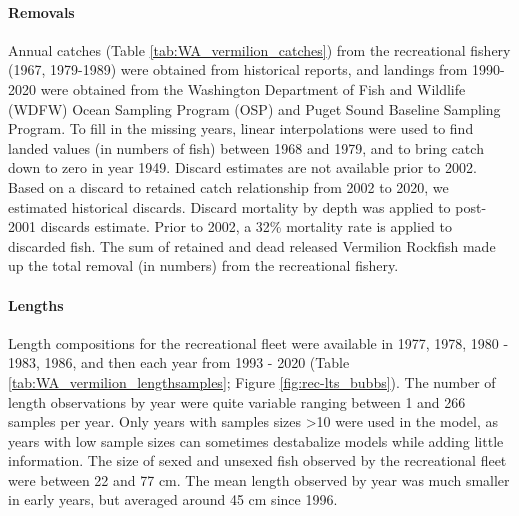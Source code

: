 \documentclass[11pt,
  english,
  a4paper,
]{article}
\begin{document}
\leavevmode\tagmcend\tagstructend


\hypertarget{removals}{%
\paragraph{Removals}\label{removals}}

\leavevmode\tagmcend\tagstructend


Annual catches (Table \ref{tab:WA_vermilion_catches}) from the recreational fishery (1967, 1979-1989) were obtained from historical reports, and landings from 1990-2020 were obtained from the Washington Department of Fish and Wildlife (WDFW) Ocean Sampling Program (OSP) and Puget Sound Baseline Sampling Program. To fill in the missing years, linear interpolations were used to find landed values (in numbers of fish) between 1968 and 1979, and to bring catch down to zero in year 1949. Discard estimates are not available prior to 2002. Based on a discard to retained catch relationship from 2002 to 2020, we estimated historical discards. Discard mortality by depth was applied to post-2001 discards estimate. Prior to 2002, a 32\% mortality rate is applied to discarded fish. The sum of retained and dead released Vermilion Rockfish made up the total removal (in numbers) from the recreational fishery.

\leavevmode\tagmcend\tagstructend\par


\hypertarget{lengths}{%
\paragraph{Lengths}\label{lengths}}

\leavevmode\tagmcend\tagstructend


Length compositions for the recreational fleet were available in 1977, 1978, 1980 - 1983, 1986, and then each year from 1993 - 2020 (Table \ref{tab:WA_vermilion_lengthsamples}; Figure \ref{fig:rec-lts_bubbs}). The number of length observations by year were quite variable ranging between 1 and 266 samples per year. Only years with samples sizes \textgreater10 were used in the model, as years with low sample sizes can sometimes destabalize models while adding little information. The size of sexed and unsexed fish observed by the recreational fleet were between 22 and 77 cm. The mean length observed by year was much smaller in early years, but averaged around 45 cm since 1996.
\end{document}
